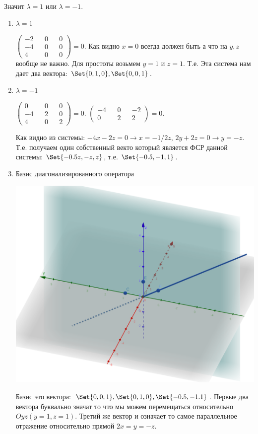\begin{enumerate}
	Значит $\lambda = 1$ или $\lambda = -1$.

	\begin{enumerate}
		\item $\lambda = 1$
		
		$
		\begin{pmatrix}
			-2 && 0 && 0\\
			-4 && 0&& 0\\
			4 && 0 && 0
		   \end{pmatrix} = 0.
		$
		Как видно $x = 0$ всегда должен быть а что на $y,z$ вообще не важно.
		 Для простоты возьмем $y = 1$ и $z = 1$. Т.е. Эта система нам дает два вектора: $\Set{0,1,0}, \Set{0,0,1}$.
		
		\item $\lambda = -1$
		
		$
		\begin{pmatrix}
			0 && 0 && 0\\
			-4 && 2 && 0\\
			4 && 0 && 2
		   \end{pmatrix} = 0.
		$	
		$
		\begin{pmatrix}
			-4 && 0 && -2\\
			0 && 2 && 2
		   \end{pmatrix} = 0.
		$

		Как видно из системы: $-4x -2z = 0 \rightarrow x = -1/2z$, 
		$2y+2z=0 \rightarrow y=-z$. Т.е. получаем один собственный векто который является ФСР данной системы: $\Set{-0.5z,-z,z}$, т.е. $\Set{-0.5,-1,1}$.
		
		\item Базис диагонализированного оператора
		
		\includegraphics[scale=0.2]{ss5.png}

		Базис это вектора: $\Set{0,0,1}, \Set{0,1,0}, \Set{-0.5,-1.1}$. Первые два вектора буквально значат то что мы можем перемещаться относительно $Oyz (y = 1, z = 1)$. Третий же вектор и означает то самое параллельное отражение относительно прямой $2x=y=-z$.

	\end{enumerate}

\end{enumerate}